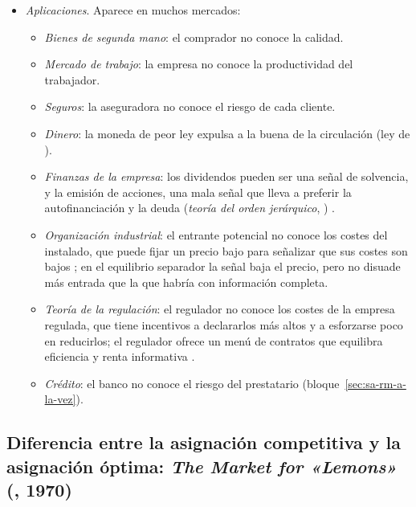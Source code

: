 \documentclass[11pt]{article}
\begin{document}
\begin{itemize}
\begin{itemize}
  \end{itemize}
\item \emph{Aplicaciones}. Aparece en muchos mercados:
  \begin{itemize}
  \item \emph{Bienes de segunda mano}: el comprador no conoce la calidad\nocite{Akerlof1970Market}.
  \item \emph{Mercado de trabajo}: la empresa no conoce la productividad del trabajador\nocite{Spence1973Job}.
  \item \emph{Seguros}: la aseguradora no conoce el riesgo de cada cliente\nocite{RothschildStiglitz1976Equilibrium,Wilson1977Model}.
  \item \emph{Dinero}: la moneda de peor ley expulsa a la buena de la circulación (ley de ).
  \item \emph{Finanzas de la empresa}: los dividendos pueden ser una señal de solvencia\nocite{Bhattacharya1979Imperfect}, y la emisión de acciones, una mala señal que lleva a preferir la autofinanciación y la deuda (\emph{teoría del orden jerárquico}, \textcite{MyersMajluf1984Corporate}) .
  \item \emph{Organización industrial}: el entrante potencial no conoce los costes del instalado, que puede fijar un precio bajo para señalizar que sus costes son bajos\nocite{MilgromRoberts1982Limit} ; en el equilibrio separador la señal baja el precio, pero no disuade más entrada que la que habría con información completa.
  \item \emph{Teoría de la regulación}: el regulador no conoce los costes de la empresa regulada, que tiene incentivos a declararlos más altos y a esforzarse poco en reducirlos; el regulador ofrece un menú de contratos que equilibra eficiencia y renta informativa\nocite{LaffontTirole1993Theory} .
  \item \emph{Crédito}: el banco no conoce el riesgo del prestatario\nocite{StiglitzWeiss1981Credit} (bloque~\ref{sec:sa-rm-a-la-vez}).
  \end{itemize}
\end{itemize}

\subsection{Diferencia entre la asignación competitiva y la asignación óptima:\cortetitulo{} \emph{The Market for «Lemons»} (, 1970)}\label{sec:akerlof}
\end{document}
